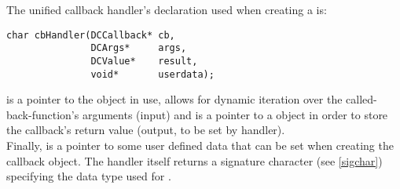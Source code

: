 The unified callback handler's declaration used when creating a 
is:

\begin{lstlisting}
char cbHandler(DCCallback* cb,
               DCArgs*     args,
               DCValue*    result,
               void*       userdata);
\end{lstlisting}

 is a pointer to the  object in use,  allows
for dynamic iteration over the called-back-function's arguments (input) and
 is a pointer to a  object in order to store the
callback's return value (output, to be set by handler).\\
Finally,  is a pointer to some user defined data that can be
set when creating the callback object.
The handler itself returns a signature character (see \ref{sigchar}) specifying the
data type used for .


